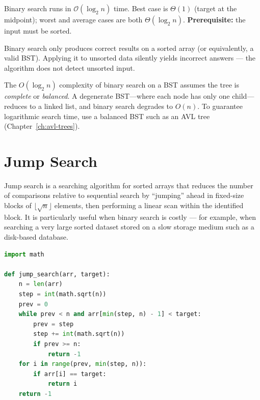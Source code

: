 \documentclass[11pt, a4paper, notitlepage]{report}
\theoremstyle{definition}
\theoremstyle{remark}
\theoremstyle{definition}
\begin{document}
\begin{keyresult}[title={Binary Search Complexity}]
Binary search runs in $\mathcal{O}(\log_2 n)$ time.  Best case is $\Theta(1)$
(target at the midpoint); worst and average cases are both $\Theta(\log_2 n)$.
\textbf{Prerequisite:} the input must be sorted.
\end{keyresult}

\begin{warning}[title={Binary Search Requires Sorted Input}]
Binary search only produces correct results on a sorted array (or equivalently,
a valid BST).  Applying it to unsorted data silently yields incorrect answers
--- the algorithm does not detect unsorted input.
\end{warning}

\begin{examtip}[title={Complete/Balanced BST Required for $O(\log n)$}]
The $O(\log_2 n)$ complexity of binary search on a BST assumes the tree is
\emph{complete} or \emph{balanced}.  A degenerate BST---where each node has
only one child---reduces to a linked list, and binary search degrades to
$O(n)$.  To guarantee logarithmic search time, use a balanced BST such as an
AVL tree (Chapter~\ref{ch:avl-trees}).
\end{examtip}

\section{Jump Search}
\label{sec:jump-search}

Jump search is a searching algorithm for sorted arrays that reduces the number
of comparisons relative to sequential search by ``jumping'' ahead in fixed-size
blocks of $\lfloor\sqrt{n}\rfloor$ elements, then performing a linear scan
within the identified block.  It is particularly useful when binary search is
costly --- for example, when searching a very large sorted dataset stored on a
slow storage medium such as a disk-based database.

\begin{lstlisting}[language=Python]
import math

def jump_search(arr, target):
    n = len(arr)
    step = int(math.sqrt(n))
    prev = 0
    while prev < n and arr[min(step, n) - 1] < target:
        prev = step
        step += int(math.sqrt(n))
        if prev >= n:
            return -1
    for i in range(prev, min(step, n)):
        if arr[i] == target:
            return i
    return -1
\end{lstlisting}
\end{document}
